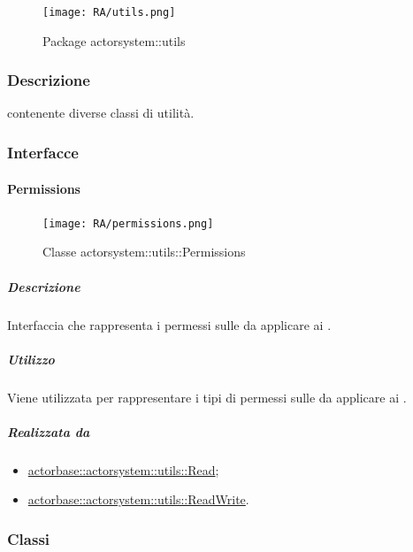 \documentclass{scalatekids-article}
\begin{document}
\begin{figure}[H]
  \begin{center}
    \texttt{[image: RA/utils.png]}
    \caption{Package actorsystem::utils}
  \end{center}
\end{figure}

\subsubsection{Descrizione}
 contenente diverse classi di utilità.

\subsubsection{Interfacce}

\paragraph{Permissions}
\label{sec:actorbase::actorsystem::utils::Permissions}

\begin{figure}[H]
  \begin{center}
    \texttt{[image: RA/permissions.png]}
    \caption{Classe actorsystem::utils::Permissions}
  \end{center}
\end{figure}

\subparagraph{Descrizione}

Interfaccia che rappresenta i permessi sulle  da applicare ai
.

\subparagraph{Utilizzo}

Viene utilizzata per rappresentare i tipi di permessi sulle 
da applicare ai .

\subparagraph{Realizzata da}

\begin{itemize}
\item \hyperref[sec:actorbase::actorsystem::utils::Read]{actorbase::actorsystem::utils::Read};
\item \hyperref[sec:actorbase::actorsystem::utils::ReadWrite]{actorbase::actorsystem::utils::ReadWrite}.
\end{itemize}

\subsubsection{Classi}
\end{document}
